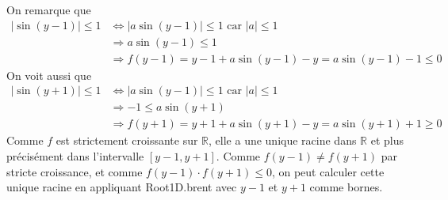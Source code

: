 \documentclass[a4paper, 12pt]{article}
\begin{document}
\begin{itemize}
\begin{itemize}
    \end{itemize}
On remarque que
\begin{align*}
    |\sin(y-1)| \leq 1 & \Longleftrightarrow |a\sin(y-1)| \leq 1 \text{ car } |a| \leq 1 \\
    & \Longrightarrow a\sin(y-1) \leq 1 \\
    & \Longrightarrow f(y-1) = y - 1 + a \sin(y-1) - y = a\sin(y-1) - 1 \leq 0
\end{align*}
On voit aussi que
\begin{align*}
    |\sin(y+1)| \leq 1 & \Longleftrightarrow |a\sin(y-1)| \leq 1 \text{ car } |a| \leq 1 \\
    & \Longrightarrow -1 \leq a\sin(y+1) \\
    & \Longrightarrow f(y+1) = y + 1 + a \sin(y+1) - y = a\sin(y+1) + 1 \geq 0
\end{align*}
Comme \( f \) est strictement croissante sur \( \mathbb{R} \), elle a une unique racine dans \( \mathbb{R} \) et plus précisément dans l'intervalle \( [y-1, y+1] \). Comme \( f(y-1) \neq f(y+1) \) par stricte croissance, et comme \( f(y-1) \cdot f(y+1) \leq 0 \), on peut calculer cette unique racine en appliquant Root1D.brent avec \( y-1 \) et \( y+1 \) comme bornes.
    

\end{itemize}
\end{document}
